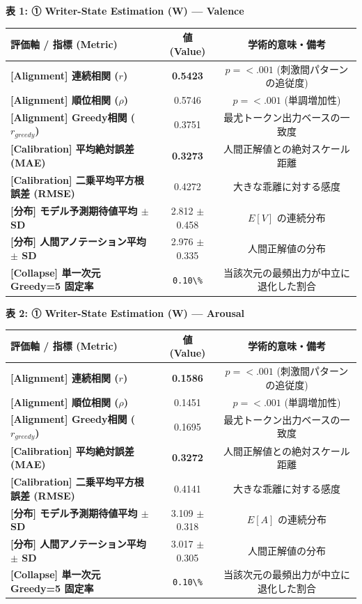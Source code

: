 \textbf{表 1: ① Writer-State Estimation (W) — Valence}
\begin{center}
\small
\begin{tabular}{lcc}
\toprule
\textbf{評価軸 / 指標 (Metric)} & \textbf{値 (Value)} & \textbf{学術的意味・備考} \\
\midrule
\textbf{[Alignment] 連続相関 ($r$)} & \textbf{0.5423} & $p = <.001 $ (刺激間パターンの追従度) \\
\textbf{[Alignment] 順位相関 ($\rho$)} & 0.5746 & $p = <.001 $ (単調増加性) \\
\textbf{[Alignment] Greedy相関 ($r_{greedy}$)} & 0.3751 & 最尤トークン出力ベースの一致度 \\
\textbf{[Calibration] 平均絶対誤差 (MAE)} & \textbf{0.3273} & 人間正解値との絶対スケール距離 \\
\textbf{[Calibration] 二乗平均平方根誤差 (RMSE)} & 0.4272 & 大きな乖離に対する感度 \\
\textbf{[分布] モデル予測期待値平均 $\pm$ SD} & 2.812 $\pm$ 0.458 & $E[V]$ の連続分布 \\
\textbf{[分布] 人間アノテーション平均 $\pm$ SD} & 2.976 $\pm$ 0.335 & 人間正解値の分布 \\
\textbf{[Collapse] 単一次元 Greedy=5 固定率} & \texttt{0.10\textbackslash{}\%} & 当該次元の最頻出力が中立に退化した割合 \\
\bottomrule
\end{tabular}
\end{center}


\textbf{表 2: ① Writer-State Estimation (W) — Arousal}
\begin{center}
\small
\begin{tabular}{lcc}
\toprule
\textbf{評価軸 / 指標 (Metric)} & \textbf{値 (Value)} & \textbf{学術的意味・備考} \\
\midrule
\textbf{[Alignment] 連続相関 ($r$)} & \textbf{0.1586} & $p = <.001 $ (刺激間パターンの追従度) \\
\textbf{[Alignment] 順位相関 ($\rho$)} & 0.1451 & $p = <.001 $ (単調増加性) \\
\textbf{[Alignment] Greedy相関 ($r_{greedy}$)} & 0.1695 & 最尤トークン出力ベースの一致度 \\
\textbf{[Calibration] 平均絶対誤差 (MAE)} & \textbf{0.3272} & 人間正解値との絶対スケール距離 \\
\textbf{[Calibration] 二乗平均平方根誤差 (RMSE)} & 0.4141 & 大きな乖離に対する感度 \\
\textbf{[分布] モデル予測期待値平均 $\pm$ SD} & 3.109 $\pm$ 0.318 & $E[A]$ の連続分布 \\
\textbf{[分布] 人間アノテーション平均 $\pm$ SD} & 3.017 $\pm$ 0.305 & 人間正解値の分布 \\
\textbf{[Collapse] 単一次元 Greedy=5 固定率} & \texttt{0.10\textbackslash{}\%} & 当該次元の最頻出力が中立に退化した割合 \\
\bottomrule
\end{tabular}
\end{center}


